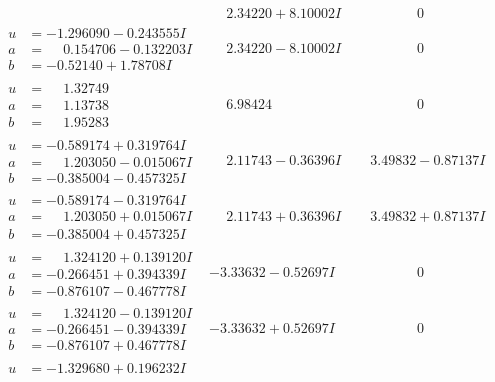 \documentclass[1p]{elsarticle_modified}
\theoremstyle{definition}
\begin{document}
$$\begin{array}{c|c|c}
 & \phantom{-}2.34220 + 8.10002 I & \phantom{-0.000000 } 0 \\ \hline\begin{aligned}
u &= -1.296090 - 0.243555 I \\
a &= \phantom{-}0.154706 - 0.132203 I \\
b &= -0.52140 + 1.78708 I\end{aligned}
 & \phantom{-}2.34220 - 8.10002 I & \phantom{-0.000000 } 0 \\ \hline\begin{aligned}
u &= \phantom{-}1.32749\phantom{ +0.000000I} \\
a &= \phantom{-}1.13738\phantom{ +0.000000I} \\
b &= \phantom{-}1.95283\phantom{ +0.000000I}\end{aligned}
 & \phantom{-}6.98424\phantom{ +0.000000I} & \phantom{-0.000000 } 0 \\ \hline\begin{aligned}
u &= -0.589174 + 0.319764 I \\
a &= \phantom{-}1.203050 - 0.015067 I \\
b &= -0.385004 - 0.457325 I\end{aligned}
 & \phantom{-}2.11743 - 0.36396 I & \phantom{-}3.49832 - 0.87137 I \\ \hline\begin{aligned}
u &= -0.589174 - 0.319764 I \\
a &= \phantom{-}1.203050 + 0.015067 I \\
b &= -0.385004 + 0.457325 I\end{aligned}
 & \phantom{-}2.11743 + 0.36396 I & \phantom{-}3.49832 + 0.87137 I \\ \hline\begin{aligned}
u &= \phantom{-}1.324120 + 0.139120 I \\
a &= -0.266451 + 0.394339 I \\
b &= -0.876107 - 0.467778 I\end{aligned}
 & -3.33632 - 0.52697 I & \phantom{-0.000000 } 0 \\ \hline\begin{aligned}
u &= \phantom{-}1.324120 - 0.139120 I \\
a &= -0.266451 - 0.394339 I \\
b &= -0.876107 + 0.467778 I\end{aligned}
 & -3.33632 + 0.52697 I & \phantom{-0.000000 } 0 \\ \hline\begin{aligned}
u &= -1.329680 + 0.196232 I \\

\end{aligned}
\end{array}$$
\end{document}
